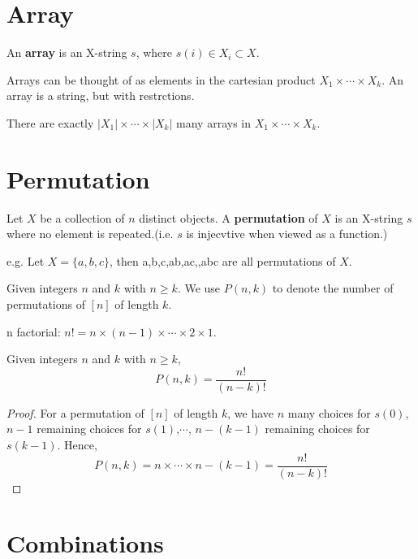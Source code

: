 \section{Array}

\begin{definition}
    An \textbf{array} is an X-string $s$, where $s(i) \in X_i \subset X$.
\end{definition}
Arrays can be thought of as elements in the cartesian product $X_1 \times \cdots \times X_k$. 
An array is a string, but with restrctions.

\begin{theorem}
    There are exactly $|X_1| \times \cdots \times |X_k|$ many arrays in $X_1 \times \cdots \times X_k$.
\end{theorem}

\section{Permutation}

\begin{definition}
    Let $X$ be a collection of $n$ distinct objects. A \textbf{permutation} of $X$ is an X-string $s$ where no element is repeated.(i.e. $s$ is injecvtive when viewed as a function.)
\end{definition}
e.g. Let $X=\{a,b,c\}$, then a,b,c,ab,ac,,abc are all permutations of $X$.

\begin{definition}
    Given integers $n$ and $k$ with $n \geq k$. We use $P(n,k)$ to denote the number of permutations of $[n]$ of length $k$.
\end{definition}

\begin{definition}
    n factorial: $n!=n \times (n-1) \times \cdots \times 2 \times 1$.
\end{definition}

\begin{theorem}
    Given integers $n$ and $k$ with $n \geq k$, $$P(n,k)=\frac{n!}{(n-k)!}$$
\end{theorem}
\begin{proof}
    For a permutation of $[n]$ of length $k$, we have $n$ many choices for $s(0)$, $n-1$ remaining choices for $s(1)$,$\cdots$, $n-(k-1)$ remaining choices for $s(k-1)$. Hence, 
    $$P(n,k)=n \times \cdots \times n-(k-1)=\frac{n!}{(n-k)!}$$
\end{proof}

\section{Combinations}

